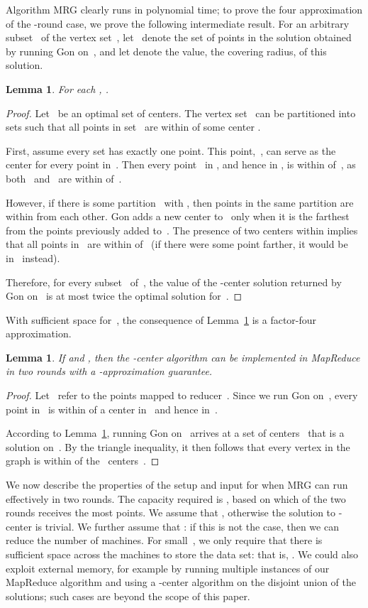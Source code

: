 \documentclass[11pt]{article}
\newtheorem{lemma}[theorem]{Lemma}
\newcommand{\ours}{{\sc MRG}\xspace}
\newcommand{\gon}{{\sc Gon}\xspace}
\begin{document}
Algorithm \ours clearly
runs in polynomial time; to prove the four approximation of the -round
case, we prove the following intermediate result.
For an arbitrary subset~ of the vertex set~,
let~ denote the set of points in the solution 
obtained by running \gon on~, and let  denote the value,
the covering radius, of this solution.

\begin{lemma}\label{thm:approx}
For each , .
\end{lemma}


\begin{proof}
Let~ be an optimal set of centers.
The vertex set~ can be partitioned into~ sets 
such that  all points in set~ are within  of some
center .


First, assume every set  has exactly one point.
This point,~,
can serve as the center
for every point in~.
Then every point~ in , and hence in , is within
 of~,
as both~ and~ are within  of~.

However, if there is some partition~
with , then points in the same partition are within  from each
other. \gon adds a new center to~
only when it is the farthest from the points previously added to~.
The presence of two centers within  implies that all
points in~ are within  of~
(if there were some point farther, it would be in~ instead).


Therefore, for every subset~ of~, the value of the -center solution
returned by \gon on~ is at most twice the optimal solution for~.
\end{proof}



With sufficient space for~,
the consequence of Lemma~\ref{thm:approx} is  a  factor-four approximation.
\begin{lemma}
\label{thm:mr}
If  and , then the -center algorithm can be implemented in MapReduce in two rounds with a -approximation guarantee. 
\end{lemma}

\begin{proof}
Let~ refer to the points mapped to reducer~.
Since we run \gon on~, every point in~ is within
 of a center in~ and hence in~.

According to Lemma~\ref{thm:approx},
running \gon on~ arrives at a set of centers~
that is a  solution on~.
By the triangle inequality, it then follows that every vertex in the graph is
within  of the ~centers~.
\end{proof}

We now describe the properties of the setup and input for when \ours
can run effectively in two rounds.
The capacity required is ,
based on which of the two rounds receives the most points. 
We assume that , otherwise the solution to -center is trivial.
We further assume that :
if this is not the case, then we can reduce
the number of machines.
For small~, we only require that there is sufficient space across the machines to store the data set: 
that is, . 
We could also exploit external memory, for example by running multiple instances of our MapReduce algorithm and using a -center
algorithm on the disjoint union of the solutions;
such cases are beyond the scope of this paper.
\end{document}
